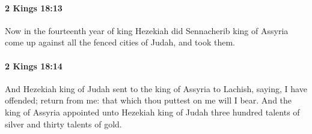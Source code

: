 		\paragraph{2 Kings 18:13} %
			\label{2KINGS-18-13}

			Now in the fourteenth year of king Hezekiah did Sennacherib king of Assyria come up against all the fenced cities of Judah, and took them.


		\paragraph{2 Kings 18:14} %
			\label{2KINGS-18-14}

			And Hezekiah king of Judah sent to the king of Assyria to Lachish, saying, I have offended; return from me: that which thou puttest on me will I bear. And the king of Assyria appointed unto Hezekiah king of Judah three hundred talents of silver and thirty talents of gold.

